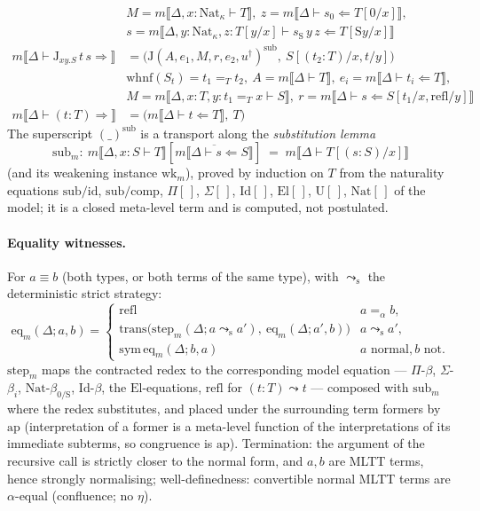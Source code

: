 \begin{align*}
 & M = m\llbracket\Delta,x:\mathrm{Nat}_\kappa\vdash T\rrbracket,\ z = m\llbracket\Delta\vdash s_0\Leftarrow T[0/x]\rrbracket,\\
 & s = m\llbracket\Delta,y:\mathrm{Nat}_\kappa, z:T[y/x]\vdash s_{\mathrm S}\,y\,z \Leftarrow T[\mathrm S y/x]\rrbracket\\
m\llbracket\Delta\vdash \mathrm J_{xy.S}\,t\,s\Rightarrow\rrbracket &= \big(\mathrm J(A, e_1, M, r, e_2, u^\dagger)^{\mathrm{sub}},\ S[(t_2:T)/x, t/y]\big)
 \\ & \mathrm{whnf}(S_t) = t_1 =_T t_2,\ A = m\llbracket\Delta\vdash T\rrbracket,\ e_i = m\llbracket\Delta\vdash t_i\Leftarrow T\rrbracket,\\
 & M = m\llbracket\Delta,x:T,y:t_1=_Tx\vdash S\rrbracket,\ r = m\llbracket\Delta\vdash s\Leftarrow S[t_1/x,\mathrm{refl}/y]\rrbracket\\
m\llbracket\Delta\vdash (t:T)\Rightarrow\rrbracket &= \big(m\llbracket\Delta\vdash t\Leftarrow T\rrbracket,\ T\big)
\end{align*}
The superscript $(\_)^{\mathrm{sub}}$ is a transport along the \emph{substitution lemma}
\[
\mathrm{sub}_m :\ m\llbracket\Delta,x:S\vdash T\rrbracket[\overline{m\llbracket\Delta\vdash s\Leftarrow S\rrbracket}] \;=\; m\llbracket\Delta\vdash T[(s:S)/x]\rrbracket
\]
(and its weakening instance $\mathrm{wk}_m$), proved by induction on $T$ from the naturality equations $\mathrm{sub/id}$, $\mathrm{sub/comp}$, $\Pi[\,]$, $\Sigma[\,]$, $\mathrm{Id}[\,]$, $\mathrm{El}[\,]$, $\mathrm{U}[\,]$, $\mathrm{Nat}[\,]$ of the model; it is a closed meta-level term and is computed, not postulated.

\paragraph{Equality witnesses.} For $a \equiv b$ (both types, or both terms of the same type), with $\leadsto_{\mathrm s}$ the deterministic strict strategy:
\[
\mathrm{eq}_m(\Delta; a, b) =
\begin{cases}
\mathrm{refl} & a =_\alpha b,\\
\mathrm{trans}\big(\mathrm{step}_m(\Delta; a\leadsto_{\mathrm s} a'),\ \mathrm{eq}_m(\Delta; a', b)\big) & a \leadsto_{\mathrm s} a',\\
\mathrm{sym}\,\mathrm{eq}_m(\Delta; b, a) & a \text{ normal}, b \text{ not}.
\end{cases}
\]
$\mathrm{step}_m$ maps the contracted redex to the corresponding model equation — $\Pi$-$\beta$, $\Sigma$-$\beta_i$, $\mathrm{Nat}$-$\beta_{0/\mathrm S}$, $\mathrm{Id}$-$\beta$, the $\mathrm{El}$-equations, $\mathrm{refl}$ for $(t:T)\leadsto t$ — composed with $\mathrm{sub}_m$ where the redex substitutes, and placed under the surrounding term formers by $\mathrm{ap}$ (interpretation of a former is a meta-level function of the interpretations of its immediate subterms, so congruence is $\mathrm{ap}$). Termination: the argument of the recursive call is strictly closer to the normal form, and $a,b$ are MLTT terms, hence strongly normalising; well-definedness: convertible normal MLTT terms are $\alpha$-equal (confluence; no $\eta$).

